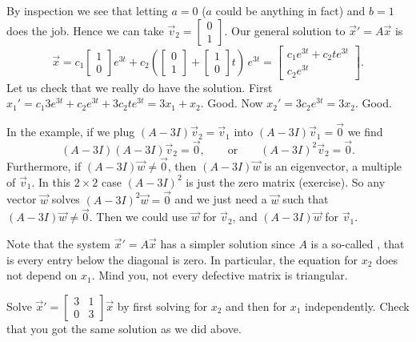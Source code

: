 \begin{example}
By inspection we see that letting $a=0$ ($a$ could be anything in fact) and
$b=1$ does the job.  Hence we can take $\vec{v}_2 = 
\left[ \begin{smallmatrix} 0 \\ 1 \end{smallmatrix} \right]$.  Our general
solution to
${\vec{x}}' = A\vec{x}$ is
\begin{equation*}
\vec{x} =
c_1 
\begin{bmatrix}
1 \\ 0
\end{bmatrix}
e^{3t}
+
c_2
\left(
\begin{bmatrix}
0 \\ 1
\end{bmatrix}
+
\begin{bmatrix}
1 \\ 0
\end{bmatrix}
t
\right)
\,
e^{3t}
=
\begin{bmatrix}
c_1 e^{3t}+c_2 te^{3t} \\
c_2 e^{3t}
\end{bmatrix} .
\end{equation*}
Let us check that we really do have the solution.  First
$x_1' = 
c_1 3 e^{3t}+c_2 e^{3t} + 3 c_2 te^{3t} = 3 x_1 + x_2$.  Good.  Now
$x_2' = 3 c_2 e^{3t} = 3x_2$.  Good.
\end{example}

In the example, if we plug $(A-3I)\vec{v}_2 = \vec{v}_1$ into
$(A-3I)\vec{v}_1 = \vec{0}$ we find
\begin{equation*}
(A-3I)(A-3I) \vec{v}_2 = \vec{0},
\qquad \text{or} \qquad
{(A-3I)}^2\vec{v}_2 = \vec{0}.
\end{equation*}
Furthermore, if 
$(A-3I) \vec{w} \not= \vec{0}$, then 
$(A-3I) \vec{w}$ is an eigenvector, a multiple of $\vec{v}_1$.
In this $2 \times 2$ case ${(A-3I)}^2$ is just the zero matrix (exercise).
So any vector $\vec{w}$ solves
${(A-3I)}^2\vec{w} = \vec{0}$ and we just need a $\vec{w}$ such that
$(A-3I)\vec{w} \not= \vec{0}$.  Then we could use
$\vec{w}$ for $\vec{v}_2$, and $(A-3I)\vec{w}$ for $\vec{v}_1$.

Note that the system ${\vec{x}}' = A \vec{x}$ has a simpler solution since
$A$ is a so-called \emph{}, that is
every entry below the diagonal is zero.
In particular, the equation for $x_2$
does not depend on $x_1$.  Mind you, not every defective matrix is
triangular.

\begin{exercise}
Solve ${\vec{x}}' = \left[ \begin{smallmatrix}
3 & 1 \\ 0 & 3
\end{smallmatrix} \right] \vec{x}$ by first solving for $x_2$ and then for
$x_1$ independently.  Check that you got the same solution as we did
above.
\end{exercise}

